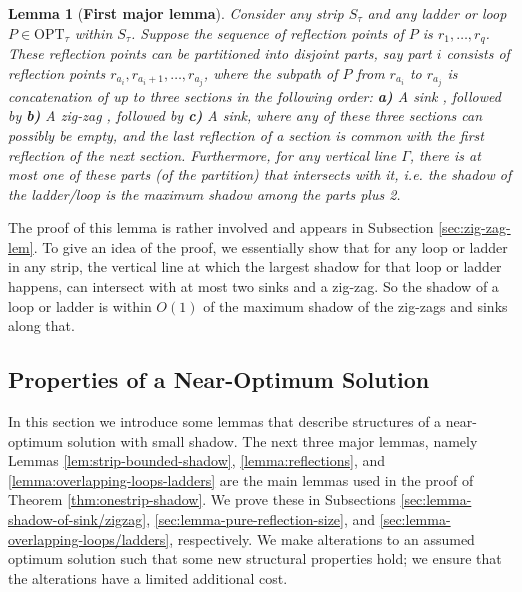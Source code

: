 \documentclass[pdflatex,sn-mathphys-num]{sn-jnl}
\theoremstyle{thmstyleone}
\newtheorem{lemma}{Lemma}
\newcommand{\OPT}{{\text{OPT}}}
\begin{document}
\begin{lemma}[\bf First major lemma]\label{lemma:zig-zag}
    Consider any strip $S_\tau$ and any ladder or loop $P\in \OPT_\tau$ within $S_\tau$. Suppose the sequence of reflection points of $P$ is $r_1,\ldots,r_q$.
    These reflection points can be partitioned into disjoint parts, say part
    $i$ consists of reflection points $r_{a_i},r_{a_i+1},\ldots,r_{a_j}$,
    where the subpath of $P$ from $r_{a_i}$ to $r_{a_j}$ is concatenation of up to three sections in the following order:
   \textbf{a)} 
    A sink
   , followed by
   \textbf{b)} 
    A zig-zag
   , followed by
   \textbf{c)} 
    A sink,
    where any of these three sections can possibly be empty, and the last reflection of a section is common with  the first reflection of the next section.
    Furthermore, for any vertical line $\Gamma$, there is at most one of these parts (of the partition) that intersects with it, i.e. the shadow of the ladder/loop is the maximum shadow among the parts plus 2.
\end{lemma}

The proof of this lemma is rather involved and appears in Subsection \ref{sec:zig-zag-lem}.
To give an idea of the proof, we essentially show that for any loop or ladder in any strip, the vertical line at which the largest shadow for that loop or ladder happens, can intersect with at most two sinks and a zig-zag. So the shadow of a loop or ladder is within $O(1)$ of the maximum shadow of the zig-zags and sinks along that. 


\subsection{Properties of a Near-Optimum Solution}
\label{sec:near-optimum-property}
In this section we introduce some lemmas that describe structures of a near-optimum solution with small shadow. The next three major lemmas, namely Lemmas
\ref{lem:strip-bounded-shadow}, \ref{lemma:reflections}, and \ref{lemma:overlapping-loops-ladders} are the main lemmas used in the proof of Theorem \ref{thm:onestrip-shadow}. 
We prove these in Subsections \ref{sec:lemma-shadow-of-sink/zigzag}, \ref{sec:lemma-pure-reflection-size}, and \ref{sec:lemma-overlapping-loops/ladders}, respectively. We make alterations to an assumed optimum solution such that some new structural properties hold; we ensure that the alterations have a limited additional cost.
\end{document}
